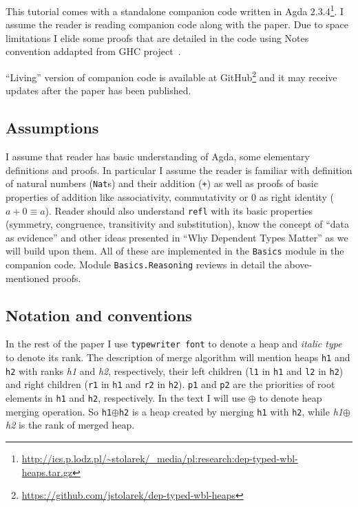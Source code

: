 This tutorial comes with a standalone companion code written in Agda 2.3.4\footnote{\url{http://ics.p.lodz.pl/~stolarek/_media/pl:research:dep-typed-wbl-heaps.tar.gz}}. I assume the reader is reading companion code along with the paper. Due to space limitations I elide some proofs that are detailed in the code using Notes convention addapted from GHC project~\cite{MarPey12}.

``Living'' version of companion code is available at GitHub\footnote{\url{https://github.com/jstolarek/dep-typed-wbl-heaps}} and it may receive updates after the paper has been published.

\subsection{Assumptions}

I assume that reader has basic understanding of Agda, some elementary definitions and proofs. In particular I assume the reader is familiar with definition of natural numbers (\texttt{Nat}s) and their addition (\texttt{+}) as well as proofs of basic properties of addition like associativity, commutativity or 0 as right identity ($a + 0 ≡ a$). Reader should also understand \texttt{refl} with its basic properties (symmetry, congruence, transitivity and substitution), know the concept of ``data as evidence'' and other ideas presented in ``Why Dependent Types Matter'' \cite{AltMcBMcK05} as we will build upon them. All of these are implemented in the \texttt{Basics} module in the companion code. Module \texttt{Basics.Reasoning} reviews in detail the above-mentioned proofs.

\subsection{Notation and conventions}

In the rest of the paper I use \texttt{typewriter font} to denote a heap and \textit{italic type} to denote its rank. The description of merge algorithm will mention heaps \texttt{h1} and \texttt{h2} with ranks \textit{h1} and \textit{h2}, respectively, their left children (\texttt{l1} in \texttt{h1} and \texttt{l2} in \texttt{h2}) and right children (\texttt{r1} in \texttt{h1} and \texttt{r2} in \texttt{h2}). \texttt{p1} and \texttt{p2} are the priorities of root elements in \texttt{h1} and \texttt{h2}, respectively. In the text I will use $\oplus$ to denote heap merging operation. So \texttt{h1}$\oplus$\texttt{h2} is a heap created by merging \texttt{h1} with \texttt{h2}, while \textit{h1}$\oplus$\textit{h2} is the rank of merged heap.

